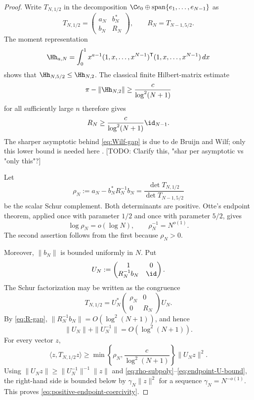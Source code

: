 \begin{proof}
Write $T_{N,1/2}$ in the decomposition
$\C e_0\oplus\operatorname{span}\{e_1,\ldots,e_{N-1}\}$ as
\begin{equation}\label{eq:block-positive-endpoint}
 T_{N,1/2}
 =\begin{pmatrix} a_N&b_N^*\\ b_N&R_N\end{pmatrix},
 \qquad
 R_N=T_{N-1,5/2}.
\end{equation}
The moment representation
\[
 \Hh_{a,N}=\int_0^1 x^{a-1}
 (1,x,\ldots,x^{N-1})^{\mathsf T}
 (1,x,\ldots,x^{N-1})\,dx
\]
shows that $\Hh_{N,5/2}\le\Hh_{N,2}$.  The classical finite Hilbert-matrix
estimate
\begin{equation}\label{eq:Wilf-gap}
 \pi-\|\Hh_{N,2}\|\ge \frac{c}{\log^2(N+1)}
\end{equation}
for all sufficiently large $n$ therefore gives
\begin{equation}\label{eq:R-gap}
 R_N\ge\frac{c}{\log^2(N+1)}\id_{N-1}.
\end{equation}
The sharper asymptotic behind \eqref{eq:Wilf-gap} is due to de Bruijn and
Wilf; only this lower bound is needed here \cite{Wilf}. [TODO: Clarify
  this, "shar per asymptotic vs "only this"?]

Let
\[
 \rho_N:=a_N-b_N^*R_N^{-1}b_N
 =\frac{\det T_{N,1/2}}{\det T_{N-1,5/2}}
\]
be the scalar Schur complement.  Both determinants are positive.  Otte's
endpoint theorem, applied once with parameter $1/2$ and once with parameter
$5/2$, gives
\begin{equation}\label{eq:rho-subpoly}
 \log\rho_N=o(\log N),
 \qquad
 \rho_N^{-1}=N^{o(1)}.
\end{equation}
The second assertion follows from the first because $\rho_N>0$.

Moreover, $\|b_N\|$ is bounded uniformly in $N$.  Put
\[
 U_N:=\begin{pmatrix}1&0\\R_N^{-1}b_N&\id\end{pmatrix}.
\]
The Schur factorization may be written as the congruence
\begin{equation}\label{eq:endpoint-LDU}
 T_{N,1/2}
 =U_N^*
   \begin{pmatrix}\rho_N&0\\0&R_N\end{pmatrix}
  U_N.
\end{equation}
By \eqref{eq:R-gap},
$\|R_N^{-1}b_N\|=O(\log^2(N+1))$, and hence
\begin{equation}\label{eq:endpoint-U-bound}
 \|U_N\|+\|U_N^{-1}\|=O(\log^2(N+1)).
\end{equation}
For every vector $z$,
\[
 \langle z,T_{N,1/2}z\rangle
 \ge
 \min\left\{\rho_N,\frac{c}{\log^2(N+1)}\right\}
 \|U_Nz\|^2.
\]
Using $\|U_Nz\|\ge\|U_N^{-1}\|^{-1}\|z\|$ and
\eqref{eq:rho-subpoly}--\eqref{eq:endpoint-U-bound}, the right-hand side is
bounded below by $\gamma_N\|z\|^2$ for a sequence
$\gamma_N=N^{-o(1)}$.  This proves
\eqref{eq:positive-endpoint-coercivity}.
\end{proof}

